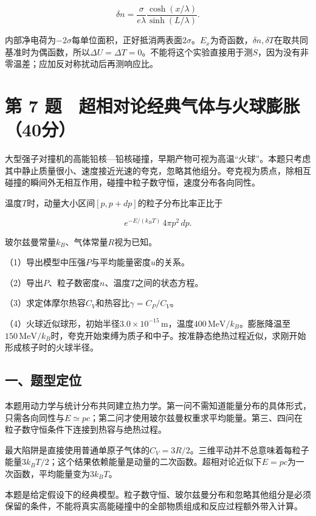 \documentclass[12pt,a4paper,fontset=fandol]{ctexart}
\begin{document}
\[
\delta n=\frac{\sigma}{e\lambda}
\frac{\cosh(x/\lambda)}{\sinh(L/\lambda)}.
\]

内部净电荷为\(-2\sigma\)每单位面积，正好抵消两表面\(2\sigma\)。\(E_x\)为奇函数，\(\delta n,\delta T\)在取共同基准时为偶函数，所以\(\Delta U=\Delta T=0\)。不能将这个实验直接用于测\(S\)，因为没有非零温差；应加反对称扰动后再测响应比。

\clearpage

\section{第 7
题　超相对论经典气体与火球膨胀（40分）}\label{ux7b2c-7-ux9898-ux8d85ux76f8ux5bf9ux8bbaux7ecfux5178ux6c14ux4f53ux4e0eux706bux7403ux81a8ux80c040ux5206}

大型强子对撞机的高能铅核---铅核碰撞，早期产物可视为高温``火球''。本题只考虑其中静止质量很小、速度接近光速的夸克，忽略其他组分。夸克视为质点，除相互碰撞的瞬间外无相互作用，碰撞中粒子数守恒，速度分布各向同性。

温度\(T\)时，动量大小区间\([p,p+dp]\)的粒子分布比率正比于

\[
e^{-E/(k_BT)}\,4\pi p^2\,dp.
\]

玻尔兹曼常量\(k_B\)、气体常量\(R\)视为已知。

（1）导出模型中压强\(P\)与平均能量密度\(u\)的关系。

（2）导出\(P\)、粒子数密度\(n\)、温度\(T\)之间的状态方程。

（3）求定体摩尔热容\(C_V\)和热容比\(\gamma=C_P/C_V\)。

（4）火球近似球形，初始半径\(3.0\times10^{-15}\,\mathrm m\)，温度\(400\,\mathrm{MeV}/k_B\)。膨胀降温至\(150\,\mathrm{MeV}/k_B\)时，夸克开始束缚为质子和中子。按准静态绝热过程近似，求刚开始形成核子时的火球半径。

\subsection{一、题型定位}\label{ux4e00ux9898ux578bux5b9aux4f4d-6}

本题用动力学与统计分布共同建立热力学。第一问不需知道能量分布的具体形式，只需各向同性与\(E\simeq pc\)；第二问才使用玻尔兹曼权重求平均能量。第三、四问在粒子数守恒条件下连接到热容与绝热过程。

最大陷阱是直接使用普通单原子气体的\(C_V=3R/2\)。三维平动并不总意味着每粒子能量\(3k_BT/2\)；这个结果依赖能量是动量的二次函数。超相对论近似下\(E=pc\)为一次函数，平均能量变为\(3k_BT\)。

本题是给定假设下的经典模型。粒子数守恒、玻尔兹曼分布和忽略其他组分是必须保留的条件，不能将真实高能碰撞中的全部物质组成和反应过程额外带入计算。
\end{document}
